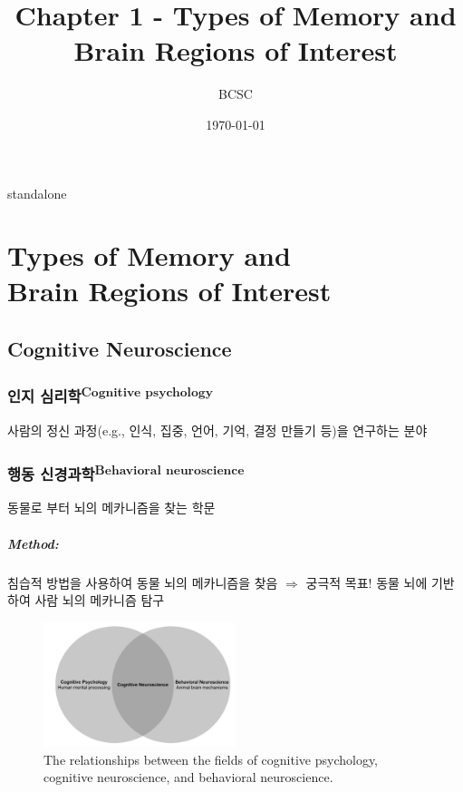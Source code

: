 \documentclass[../note.tex]{subfiles}
\title{Chapter 1 - Types of Memory and Brain Regions of Interest}
\author{BCSC}
\date{\today}
\providecommand{\mainfile}{standalone}
\begin{document}
\ifx\mainfile\empty\else
    \maketitle
    \newpage
\fi


\chapter{Types of Memory and\\Brain Regions of Interest}

\section{Cognitive Neuroscience}

\subsection{인지 심리학\textsuperscript{Cognitive psychology}}
사람의 정신 과정(e.g., 인식, 집중, 언어, 기억, 결정 만들기 등)을 연구하는 분야

\subsection{행동 신경과학\textsuperscript{Behavioral neuroscience}}
동물로 부터 뇌의 메카니즘을 찾는 학문\\

\paragraph{Method: }
침습적 방법을 사용하여 동물 뇌의 메카니즘을 찾음 $\Rightarrow$ 궁극적 목표! 동물 뇌에 기반하여 사람 뇌의 메카니즘 탐구

\begin{figure}[h]
  \centering
  \includegraphics[width=0.5\textwidth]{image/cognitive_relationship}
  \caption{The relationships between the fields of cognitive psychology, cognitive
neuroscience, and behavioral neuroscience.}
  \label{fig:cognitive_relationship}
\end{figure}
\end{document}
